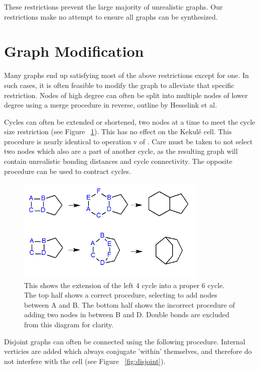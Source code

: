 \documentclass[12pt]{article}
\begin{document}
These restrictions prevent the large majority of unrealistic graphs. Our restrictions make no attempt to ensure all graphs can be synthesized. 

\section{Graph Modification}

Many graphs end up satisfying most of the above restrictions except for one. In such cases, it is often feasible to modify the graph to alleviate that specific restriction. Nodes of high degree can often be split into multiple nodes of lower degree using a merge procedure in reverse, outline by Hesselink et al\cite{HH13}. 

Cycles can often be extended or shortened, two nodes at a time to meet the cycle size restriction (see Figure ~\ref{fig:cycleExtension}). This has no effect on the Kekul\'e cell. This procedure is nearly identical to operation v of \cite{v06}. Care must be taken to not select two nodes which also are a part of another cycle, as the resulting graph will contain unrealistic bonding distances and cycle connectivity. The opposite procedure can be used to contract cycles.

\begin{figure}[ht!]
\centering
\includegraphics[width=90mm]{cycleExtension.png}
\caption{This shows the extension of the left 4 cycle into a proper 6 cycle. The top half shows a correct procedure, selecting to add nodes between A and B. The bottom half shows the incorrect procedure of adding two nodes in between B and D. Double bonds are excluded from this diagram for clarity.}
\label{fig:cycleExtension}
\end{figure}

Disjoint graphs can often be connected using the following procedure. Internal verticies are added which always conjugate ’within’ themselves, and therefore do not interfere with the cell (see Figure ~\ref{fig:disjoint}).
\end{document}
